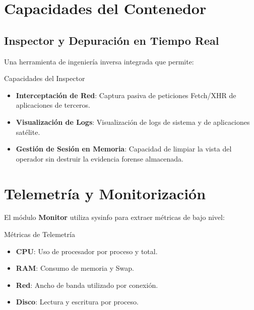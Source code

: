 
\section{Capacidades del Contenedor}

\subsection{Inspector y Depuración en Tiempo Real}

Una herramienta de ingeniería inversa integrada que permite:

\begin{caja}{Capacidades del Inspector}
\begin{itemize}
\item \textbf{Interceptación de Red}: Captura pasiva de peticiones Fetch/XHR de aplicaciones de terceros.
\item \textbf{Visualización de Logs}: Visualización de logs de sistema y de aplicaciones satélite.
\item \textbf{Gestión de Sesión en Memoria}: Capacidad de limpiar la vista del operador sin destruir la evidencia forense almacenada.
\end{itemize}
\end{caja}


\section{Telemetría y Monitorización}

El módulo \textbf{Monitor} utiliza sysinfo para extraer métricas de bajo nivel:

\begin{caja}{Métricas de Telemetría}
\begin{itemize}
\item \textbf{CPU}: Uso de procesador por proceso y total.
\item \textbf{RAM}: Consumo de memoria y Swap.
\item \textbf{Red}: Ancho de banda utilizado por conexión.
\item \textbf{Disco}: Lectura y escritura por proceso.
\end{itemize}
\end{caja}

